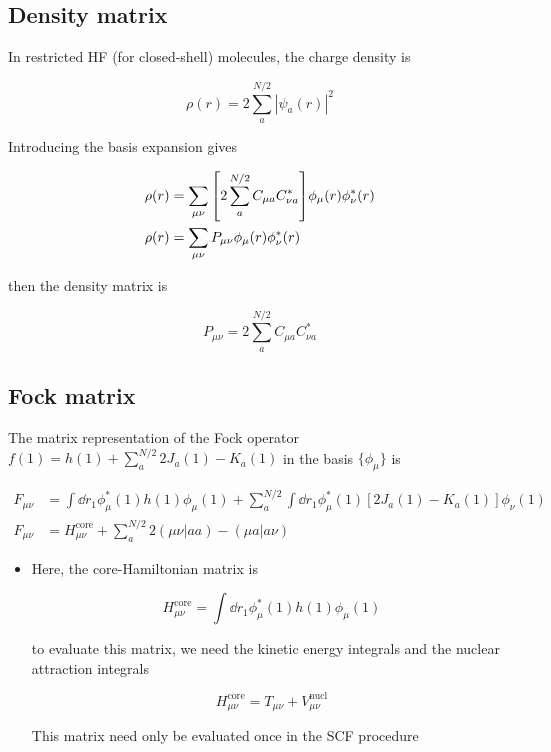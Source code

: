 \documentclass[11pt]{article}
\begin{document}
\subsection{Density matrix}
\label{sec:orgc39d8fc}

In restricted HF (for closed-shell) molecules, the charge density is

\[ \rho(r) = 2 \sum_a^{N/2} |\psi_a(r)|^2 \]

Introducing the basis expansion gives

\begin{align*}
    \rho(r) &= \sum_{\mu\nu}\qty[2\sum_a^{N/2}C_{\mu a}C_{\nu a}^{ * }]\phi_{\mu}(r)\phi_{\nu}^{ * }(r) \\
    \rho(r) &= \sum_{\mu\nu} P_{\mu\nu}\phi_{\mu}(r)\phi_{\nu}^{ * }(r)
\end{align*}

then the density matrix is

\begin{equation}
\label{eq:P-mat}
P_{\mu\nu}= 2 \sum_a^{N/2} C_{\mu a}C_{\nu a}^{ * }
\end{equation}
\subsection{Fock matrix}
\label{sec:org20beb46}

The matrix representation of the Fock operator \(f(1) = h(1) + \displaystyle\sum_a^{N/2} 2J_a(1) - K_a(1)\) in the basis \(\{\phi_{\mu}\}\) is

\begin{align*}
    F_{\mu\nu} &= \int\dd{r_1} \phi_{\mu}^{ * }(1)h(1)\phi_{\mu}(1) + \sum_a^{N/2}\int\dd{r_1}\phi_{\mu}^{ * }(1)[2J_a(1)-K_a(1)]\phi_{\nu}(1) \\
    F_{\mu\nu} &= H_{\mu\nu}^{\text{core}} + \sum_a^{N/2} 2 (\mu\nu|aa) - (\mu a|a \nu)
\end{align*}

\begin{itemize}
\item Here, the core-Hamiltonian matrix is

\[ H_{\mu\nu}^{\text{core}} = \int \dd{r_1} \phi_{\mu}^{ * }(1)h(1)\phi_{\mu}(1) \]

to evaluate this matrix, we need the kinetic energy integrals and the nuclear attraction integrals

\[ H_{\mu\nu}^{\text{core}} = T_{\mu\nu}+ V_{\mu\nu}^{\text{nucl}} \]

This matrix need only be evaluated once in the SCF procedure
\end{itemize}
\end{document}
